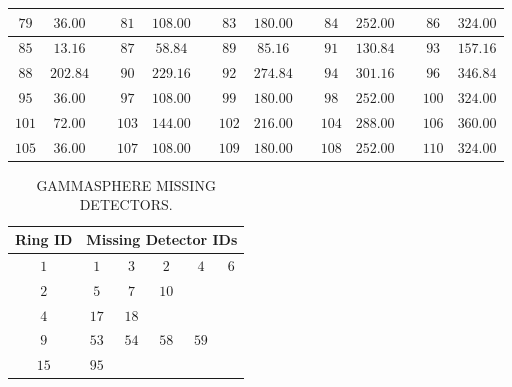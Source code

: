 \begin{table}
\begin{center}
\begin{tabular}{|c|c|c|c|c|c|c|c|c|c|c|c|c|c|}
\hline{} $79$& $36.00$& & $81$&$108.00$& & $83$&$180.00$& & $84$&$252.00$& & $86$&$324.00$\\
\hline{} $85$& $13.16$& & $87$& $58.84$& & $89$& $85.16$& & $91$&$130.84$& & $93$&$157.16$\\
\hline{} $88$&$202.84$& & $90$&$229.16$& & $92$&$274.84$& & $94$&$301.16$& & $96$&$346.84$\\
\hline{} $95$& $36.00$& & $97$&$108.00$& & $99$&$180.00$& & $98$&$252.00$& &$100$&$324.00$\\
\hline{}$101$& $72.00$& &$103$&$144.00$& &$102$&$216.00$& &$104$&$288.00$& &$106$&$360.00$\\
\hline{}$105$& $36.00$& &$107$&$108.00$& &$109$&$180.00$& &$108$&$252.00$& &$110$&$324.00$\\
\hline
\hline
\end{tabular}
\end{center}
\end{table}

\begin{table}
\caption{GAMMASPHERE MISSING DETECTORS.\label{tbl:app1-gs-missing-det}}
\begin{center}
\begin{tabular}{|c|ccccc|}
\hline
\hline
Ring ID & \multicolumn{5}{|c|}{Missing Detector IDs}\\ 
\hline{}$1$&$1$&$3$&$2$&$4$&$6$\\
\hline{}$2$&$5$&$7$&$10$&&\\
\hline{}$4$&$17$&$18$&&&\\
\hline{}$9$&$53$&$54$&$58$&$59$&\\
\hline{}$15$&$95$&&&&\\
\hline
\hline
\end{tabular}
\end{center}
\end{table}
